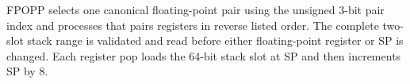 FPOPP selects one canonical floating-point pair using the unsigned 3-bit pair index and processes that pair\textquotesingle{}s registers in reverse listed order. The complete two-slot stack range is validated and read before either floating-point register or SP is changed. Each register pop loads the 64-bit stack slot at SP and then increments SP by 8.
